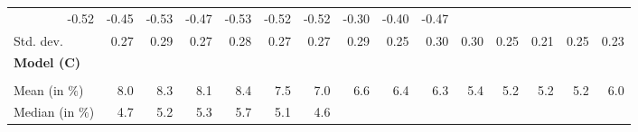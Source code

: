 \begin{tabular}{lllllllllllllll}
  \multicolumn{1}{r}{-0.52} &
  \multicolumn{1}{r}{-0.45} &
  \multicolumn{1}{r}{-0.53} &
  \multicolumn{1}{r}{-0.47} &
  \multicolumn{1}{r}{-0.53} &
  \multicolumn{1}{r}{-0.52} &
  \multicolumn{1}{r}{-0.52} &
  \multicolumn{1}{r}{-0.30} &
  \multicolumn{1}{r}{-0.40} &
  \multicolumn{1}{r}{-0.47} \\
\multicolumn{1}{l}{\hspace{2em}Std. dev.} &
  \multicolumn{1}{|r}{0.27} &
  \multicolumn{1}{r}{0.29} &
  \multicolumn{1}{r}{0.27} &
  \multicolumn{1}{r}{0.28} &
  \multicolumn{1}{r}{0.27} &
  \multicolumn{1}{r}{0.27} &
  \multicolumn{1}{r}{0.29} &
  \multicolumn{1}{r}{0.25} &
  \multicolumn{1}{r}{0.30} &
  \multicolumn{1}{r}{0.30} &
  \multicolumn{1}{r}{0.25} &
  \multicolumn{1}{r}{0.21} &
  \multicolumn{1}{r}{0.25} &
  \multicolumn{1}{r}{0.23} \\
\multicolumn{1}{l}{{\textbf{Model (C)}}} &
  \multicolumn{1}{|r}{} &
  \multicolumn{1}{r}{} &
  \multicolumn{1}{r}{} &
  \multicolumn{1}{r}{} &
  \multicolumn{1}{r}{} &
  \multicolumn{1}{r}{} &
  \multicolumn{1}{r}{} &
  \multicolumn{1}{r}{} &
  \multicolumn{1}{r}{} &
  \multicolumn{1}{r}{} &
  \multicolumn{1}{r}{} &
  \multicolumn{1}{r}{} &
  \multicolumn{1}{r}{} &
  \multicolumn{1}{r}{} \\
\multicolumn{1}{l}{\hspace{1em}{\textit{Additive term} ($\widehat{t}^{add}/\widetilde{p}$)}} &
  \multicolumn{1}{|r}{} &
  \multicolumn{1}{r}{} &
  \multicolumn{1}{r}{} &
  \multicolumn{1}{r}{} &
  \multicolumn{1}{r}{} &
  \multicolumn{1}{r}{} &
  \multicolumn{1}{r}{} &
  \multicolumn{1}{r}{} &
  \multicolumn{1}{r}{} &
  \multicolumn{1}{r}{} &
  \multicolumn{1}{r}{} &
  \multicolumn{1}{r}{} &
  \multicolumn{1}{r}{} &
  \multicolumn{1}{r}{} \\
\multicolumn{1}{l}{\hspace{2em}Mean (in $\%$)} &
  \multicolumn{1}{|r}{8.0} &
  \multicolumn{1}{r}{8.3} &
  \multicolumn{1}{r}{8.1} &
  \multicolumn{1}{r}{8.4} &
  \multicolumn{1}{r}{7.5} &
  \multicolumn{1}{r}{7.0} &
  \multicolumn{1}{r}{6.6} &
  \multicolumn{1}{r}{6.4} &
  \multicolumn{1}{r}{6.3} &
  \multicolumn{1}{r}{5.4} &
  \multicolumn{1}{r}{5.2} &
  \multicolumn{1}{r}{5.2} &
  \multicolumn{1}{r}{5.2} &
  \multicolumn{1}{r}{6.0} \\
\multicolumn{1}{l}{\hspace{2em}Median (in $\%$)} &
  \multicolumn{1}{|r}{4.7} &
  \multicolumn{1}{r}{5.2} &
  \multicolumn{1}{r}{5.3} &
  \multicolumn{1}{r}{5.7} &
  \multicolumn{1}{r}{5.1} &
  \multicolumn{1}{r}{4.6} &

\end{tabular}
